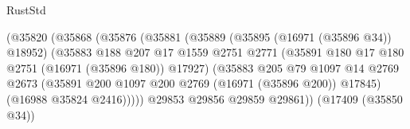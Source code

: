 \begin{lexlean}{RustStd}
\begin{coremodule}
                                              (@35820
                                                (@35868
                                                  (@35876
                                                    (@35881
                                                      (@35889
                                                        (@35895 (@16971 (@35896 @34)) @18952)
                                                        (@35883
                                                          @188
                                                          @207
                                                          @17
                                                          @1559
                                                          @2751
                                                          @2771
                                                          (@35891
                                                            @180
                                                            @17
                                                            @180
                                                            @2751
                                                            (@16971 (@35896 @180))
                                                            @17927)
                                                          (@35883
                                                            @205
                                                            @79
                                                            @1097
                                                            @14
                                                            @2769
                                                            @2673
                                                            (@35891
                                                              @200
                                                              @1097
                                                              @200
                                                              @2769
                                                              (@16971 (@35896 @200))
                                                              @17845)
                                                            (@16988 @35824 @2416)))))
                                                    @29853
                                                    @29856
                                                    @29859
                                                    @29861))
                                                (@17409 (@35850 @34))

\end{coremodule}
\end{lexlean}
